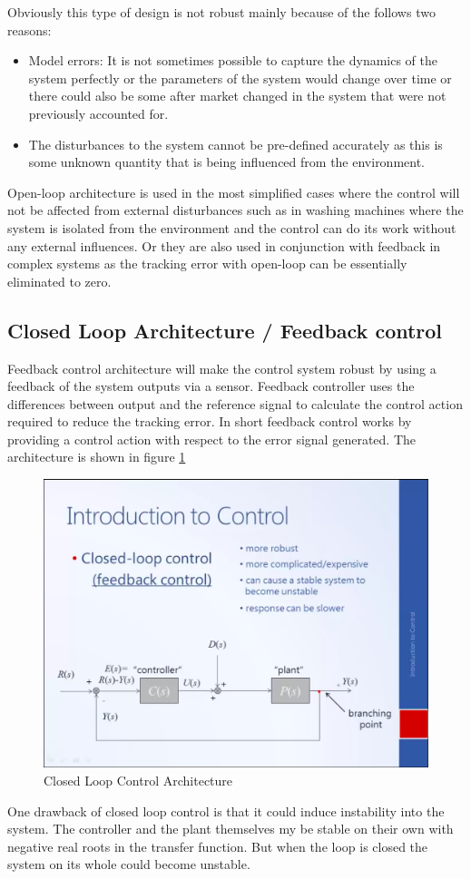 Obviously this type of design is not robust mainly because of the follows two reasons:
\begin{itemize}
	\item Model errors: It is not sometimes possible to capture the dynamics of the system perfectly or the parameters of the system would change over time or there could also be some after market changed in the system that were not previously accounted for.
	\item The disturbances to the system cannot be pre-defined accurately as this is some unknown quantity that is being influenced from the environment.
\end{itemize}
Open-loop architecture is used in the most simplified cases where the control will not be affected from external disturbances such as in washing machines where the system is isolated from the environment and the control can do its work without any external influences. Or they are also used in conjunction with feedback in complex systems as the tracking error with open-loop can be essentially eliminated to zero.

\subsection{Closed Loop Architecture / Feedback control} \label{Sec_ClosedLoopArchitecture}

Feedback control architecture will make the control system robust by using a feedback of the system outputs via a sensor. Feedback controller uses the differences between output and the reference signal to calculate the control action required to reduce the tracking error. In short feedback control works by providing a control action with respect to the error signal generated. The architecture is shown in figure \ref{fig_ClosedLoopControl}
\begin{figure}[h!]
	\centering
	\includegraphics[width=0.8\linewidth]{Bilder/ClosedLoopControl}
	\caption{Closed Loop Control Architecture}
	\label{fig_ClosedLoopControl}
\end{figure}
\newpage
One drawback of closed loop control is that it could induce instability into the system. The controller and the plant themselves my be stable on their own with negative real roots in the transfer function. But when the loop is closed the system on its whole could become unstable.

